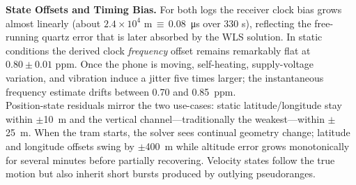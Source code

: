         \vspace{0.5em}
        \textbf{State Offsets and Timing Bias.} 
        For both logs the receiver clock bias grows almost linearly
        (about $2.4\times10^{4}$ \si{\metre}\,$\equiv$\,\SI{0.08}{\micro\second} over
        330 s), reflecting the free-running quartz error that is later absorbed by the WLS
        solution.  In static conditions the derived clock \emph{frequency} offset remains
        remarkably flat at $0.80\pm0.01$ \si{ppm}.  Once the phone is moving, self-heating,
        supply-voltage variation, and vibration induce a jitter five times larger; the
        instantaneous frequency estimate drifts between 0.70 and \SI{0.85}{ppm}.\\[2pt]
        Position-state residuals mirror the two use-cases: static latitude/longitude stay within
        $\pm$\SI{10}{\metre} and the vertical channel—traditionally the weakest—within
        $\pm$\SI{25}{\metre}.  When the tram starts, the solver sees continual geometry change;
        latitude and longitude offsets swing by $\pm$\SI{400}{\metre} while altitude error grows
        monotonically for several minutes before partially recovering.  Velocity states follow the
        true motion but also inherit short bursts produced by outlying pseudoranges.



